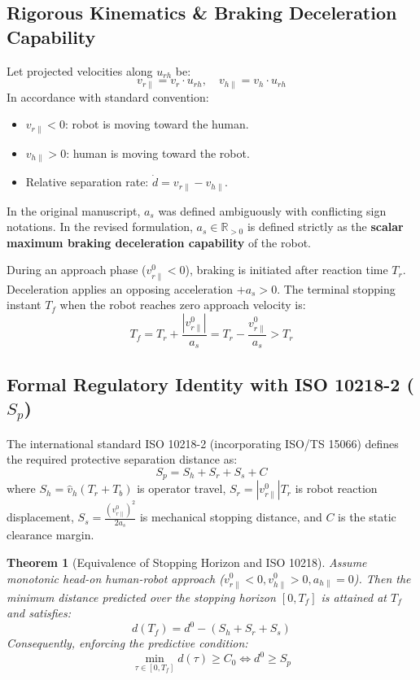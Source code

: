 \documentclass[10pt,twocolumn,a4paper]{article}
\newtheorem{theorem}{Theorem}
\begin{document}
\subsection{Rigorous Kinematics \& Braking Deceleration Capability}
Let projected velocities along $u_{rh}$ be:
\begin{equation}
v_{r\parallel} = v_r \cdot u_{rh}, \quad v_{h\parallel} = v_h \cdot u_{rh}
\end{equation}
In accordance with standard convention:
\begin{itemize}
    \item $v_{r\parallel} < 0$: robot is moving toward the human.
    \item $v_{h\parallel} > 0$: human is moving toward the robot.
    \item Relative separation rate: $\dot{d} = v_{r\parallel} - v_{h\parallel}$.
\end{itemize}
In the original manuscript, $a_s$ was defined ambiguously with conflicting sign notations. In the revised formulation, $a_s \in \mathbb{R}_{>0}$ is defined strictly as the \textbf{scalar maximum braking deceleration capability} of the robot. 

During an approach phase ($v_{r\parallel}^0 < 0$), braking is initiated after reaction time $T_r$. Deceleration applies an opposing acceleration $+a_s > 0$. The terminal stopping instant $T_f$ when the robot reaches zero approach velocity is:
\begin{equation}
T_f = T_r + \frac{|v_{r\parallel}^0|}{a_s} = T_r - \frac{v_{r\parallel}^0}{a_s} > T_r
\end{equation}

\subsection{Formal Regulatory Identity with ISO 10218-2 \texorpdfstring{($S_p$)}{(Sp)}}
The international standard ISO 10218-2 (incorporating ISO/TS 15066) defines the required protective separation distance as:
\begin{equation}
S_p = S_h + S_r + S_s + C
\end{equation}
where $S_h = \hat{v}_h (T_r + T_b)$ is operator travel, $S_r = |v_{r\parallel}^0| T_r$ is robot reaction displacement, $S_s = \frac{(v_{r\parallel}^0)^2}{2 a_s}$ is mechanical stopping distance, and $C$ is the static clearance margin.

\begin{theorem}[Equivalence of Stopping Horizon and ISO 10218]
Assume monotonic head-on human-robot approach ($v_{r\parallel}^0 < 0, v_{h\parallel}^0 > 0, a_{h\parallel} = 0$). Then the minimum distance predicted over the stopping horizon $[0, T_f]$ is attained at $T_f$ and satisfies:
\begin{equation}
d(T_f) = d^0 - (S_h + S_r + S_s)
\end{equation}
Consequently, enforcing the predictive condition:
\begin{equation}
\min_{\tau \in [0, T_f]} d(\tau) \ge C_0 \iff d^0 \ge S_p
\end{equation}
\end{theorem}
\end{document}
